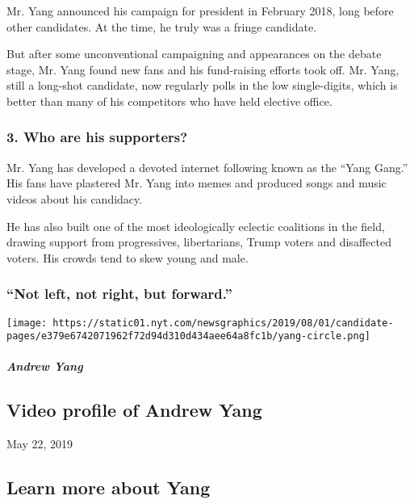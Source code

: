 Mr. Yang announced his campaign for president in February 2018, long
before other candidates. At the time, he truly was a fringe candidate.

But after some unconventional campaigning and appearances on the debate
stage, Mr. Yang found new fans and his fund-raising efforts took off.
Mr. Yang, still a long-shot candidate, now regularly polls in the low
single-digits, which is better than many of his competitors who have
held elective office.

\hypertarget{3-who-are-his-supporters}{%
\subsubsection{\texorpdfstring{\textbf{3. Who are his
supporters?}}{3. Who are his supporters?}}\label{3-who-are-his-supporters}}

Mr. Yang has developed a devoted internet following known as the ``Yang
Gang.'' His fans have plastered Mr. Yang into memes and produced songs
and music videos about his candidacy.

He has also built one of the most ideologically eclectic coalitions in
the field, drawing support from progressives, libertarians, Trump voters
and disaffected voters. His crowds tend to skew young and male.

\hypertarget{not-left-not-right-but-forward}{%
\subsubsection{``Not left, not right, but
forward.''}\label{not-left-not-right-but-forward}}

\texttt{[image: https://static01.nyt.com/newsgraphics/2019/08/01/candidate-pages/e379e6742071962f72d94d310d434aee64a8fc1b/yang-circle.png]}

\hypertarget{andrew-yang-1}{%
\subparagraph{Andrew Yang}\label{andrew-yang-1}}

\hypertarget{video-profile-of-andrew-yang}{%
\subsection{Video profile of Andrew
Yang}\label{video-profile-of-andrew-yang}}

May 22, 2019

\hypertarget{learn-more-about-yang}{%
\subsection{Learn more about Yang}\label{learn-more-about-yang}}

